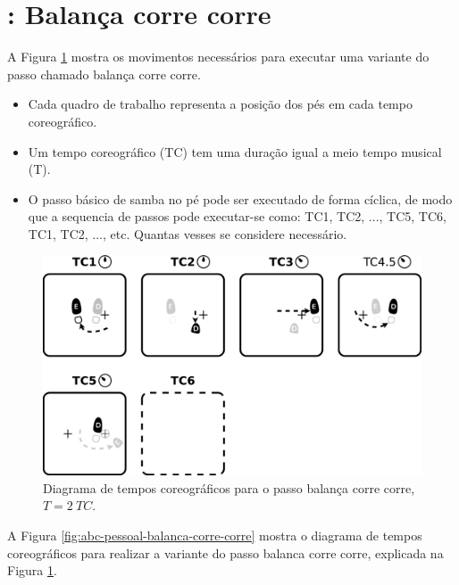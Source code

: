 
\section{\Variante: Balança corre corre}


A Figura \ref{fig:pessoa-balanca-corre-corre} mostra os movimentos necessários para executar uma variante do passo chamado balança corre corre.
\begin{itemize}
\item Cada quadro de trabalho representa a posição dos pés em cada tempo coreográfico.
\item Um tempo coreográfico (TC) tem uma duração igual a meio tempo musical (T).
\item O passo básico de samba no pé  pode ser executado de forma cíclica, de modo que 
a sequencia de passos pode executar-se como: TC1, TC2, ..., TC5, TC6, TC1, TC2, ..., etc.  
Quantas vesses se considere necessário.
\end{itemize}

\begin{figure}[!h]
  \centering
    \includegraphics[width=\workboxsize]{chapters/cap-passos-footwork/balanca-corre-corre.eps}
\caption{Diagrama de tempos coreográficos para o passo balança corre corre, $T=2~TC$.}
\label{fig:pessoa-balanca-corre-corre}
\end{figure}




A Figura \ref{fig:abc-pessoal-balanca-corre-corre} mostra o diagrama de tempos coreográficos para realizar a variante do passo balanca corre corre,
explicada na Figura \ref{fig:pessoa-balanca-corre-corre}.


